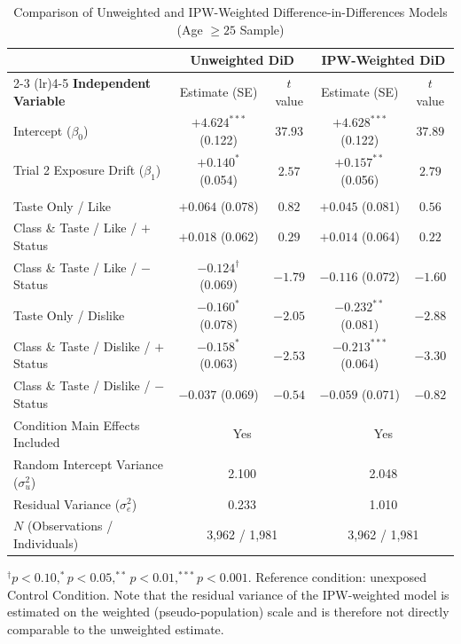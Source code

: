 \begin{table}[ht!]
\centering
\small
\caption{Comparison of Unweighted and IPW-Weighted Difference-in-Differences Models (Age $\ge 25$ Sample)}
\label{tbl:appendix_did_compare}
\setlength{\tabcolsep}{4.5pt}
\begin{tabular*}{\linewidth}{@{\extracolsep{\fill}}lcccc@{}}
\toprule
 & \multicolumn{2}{c}{\textbf{Unweighted DiD}} & \multicolumn{2}{c}{\textbf{IPW-Weighted DiD}} \\
\cmidrule(lr){2-3} \cmidrule(lr){4-5}
\textbf{Independent Variable} & Estimate (SE) & $t$ value & Estimate (SE) & $t$ value \\
\midrule
Intercept ($\beta_0$) & $+4.624^{***}$ (0.122) & $37.93$ & $+4.628^{***}$ (0.122) & $37.89$ \\
Trial 2 Exposure Drift ($\beta_{1}$) & $+0.140^{\ast}$ (0.054) & $2.57$ & $+0.157^{**}$ (0.056) & $2.79$ \\
\addlinespace[3pt]
\multicolumn{5}{l}{\textit{Difference-in-Differences Treatment Effects ($\text{Trial} \times \text{Condition}$):}} \\
\quad Taste Only / Like & $+0.064$ (0.078) & $0.82$ & $+0.045$ (0.081) & $0.56$ \\
\quad Class \& Taste / Like / $+$Status & $+0.018$ (0.062) & $0.29$ & $+0.014$ (0.064) & $0.22$ \\
\quad Class \& Taste / Like / $-$Status & $-0.124^{\dagger}$ (0.069) & $-1.79$ & $-0.116$ (0.072) & $-1.60$ \\
\quad Taste Only / Dislike & $-0.160^{\ast}$ (0.078) & $-2.05$ & $-0.232^{**}$ (0.081) & $-2.88$ \\
\quad Class \& Taste / Dislike / $+$Status & $-0.158^{\ast}$ (0.063) & $-2.53$ & $-0.213^{***}$ (0.064) & $-3.30$ \\
\quad Class \& Taste / Dislike / $-$Status & $-0.037$ (0.069) & $-0.54$ & $-0.059$ (0.071) & $-0.82$ \\
\addlinespace[3pt]
Condition Main Effects Included & \multicolumn{2}{c}{Yes} & \multicolumn{2}{c}{Yes} \\
Random Intercept Variance ($\sigma^2_u$) & \multicolumn{2}{c}{2.100} & \multicolumn{2}{c}{2.048} \\
Residual Variance ($\sigma^2_e$) & \multicolumn{2}{c}{0.233} & \multicolumn{2}{c}{1.010} \\
$N$ (Observations / Individuals) & \multicolumn{2}{c}{3,962 / 1,981} & \multicolumn{2}{c}{3,962 / 1,981} \\
\bottomrule
\end{tabular*}
\begin{minipage}{\linewidth}
\vspace{4pt}
\footnotesize
$^{\dagger}p < 0.10, ^{*}p < 0.05, ^{**}p < 0.01, ^{***}p < 0.001$. Reference condition: unexposed Control Condition. Note that the residual variance of the IPW-weighted model is estimated on the weighted (pseudo-population) scale and is therefore not directly comparable to the unweighted estimate.
\end{minipage}
\end{table}
